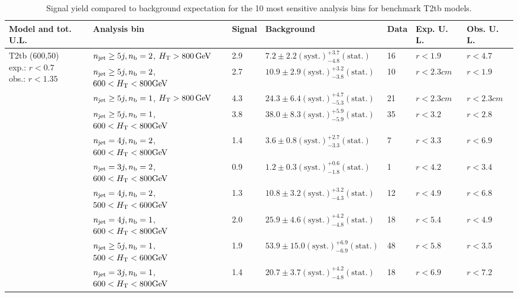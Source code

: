 \begin{table}[h!] 
  \scriptsize
  \caption{ 
Signal yield compared to background expectation for the 10 most sensitive analysis bins 
for benchmark T2tb models.
  \label{tab:sigBenchmarksYields_T2tb}}
  \centering 
  \begin{tabular}{ lllllll } 
    \hline 
    \hline 
    Model and tot. U.L. & Analysis bin & Signal & Background & Data & Exp. U. L. & Obs. U. L. \\ \hline
\multirow{10}{*}{\parbox[t]{2.3cm}{T2tb (600,50)\\exp.: $r<0.7$\\obs.: $r<1.35$}}
 & $n_{\mathrm{jet}} \geq5j,n_{\text{b}} =2$, $\mbox{$H_\text{T}$} > 800 \, \mathrm{GeV}$ & 2.9 & $7.2 \pm 2.2 \mathrm{(syst.)} ^{+3.7}_{-4.8} \mathrm{(stat.)}$ & 16 & $r < 1.9$ & $r < 4.7$\\ 
 & $n_{\mathrm{jet}} \geq5j,n_{\text{b}} =2$, $600 < \mbox{$H_\text{T}$} < 800 \mathrm{GeV}$ & 2.7 & $10.9 \pm 2.9 \mathrm{(syst.)} ^{+3.2}_{-3.8} \mathrm{(stat.)}$ & 10 & $r < 2.3cm$ & $r < 1.9$\\ 
 & $n_{\mathrm{jet}} \geq5j,n_{\text{b}} =1$, $\mbox{$H_\text{T}$} > 800 \, \mathrm{GeV}$ & 4.3 & $24.3 \pm 6.4 \mathrm{(syst.)} ^{+4.7}_{-5.3} \mathrm{(stat.)}$ & 21 & $r < 2.3cm$ & $r < 2.3cm$\\ 
 & $n_{\mathrm{jet}} \geq5j,n_{\text{b}} =1$, $600 < \mbox{$H_\text{T}$} < 800 \mathrm{GeV}$ & 3.8 & $38.0 \pm 8.3 \mathrm{(syst.)} ^{+5.9}_{-5.9} \mathrm{(stat.)}$ & 35 & $r < 3.2$ & $r < 2.8$\\ 
 & $n_{\mathrm{jet}} =4j,n_{\text{b}} =2$, $600 < \mbox{$H_\text{T}$} < 800 \mathrm{GeV}$ & 1.4 & $3.6 \pm 0.8 \mathrm{(syst.)} ^{+2.7}_{-3.3} \mathrm{(stat.)}$ & 7 & $r < 3.3$ & $r < 6.9$\\ 
 & $n_{\mathrm{jet}} =3j,n_{\text{b}} =2$, $600 < \mbox{$H_\text{T}$} < 800 \mathrm{GeV}$ & 0.9 & $1.2 \pm 0.3 \mathrm{(syst.)} ^{+0.6}_{-1.8} \mathrm{(stat.)}$ & 1 & $r < 4.2$ & $r < 3.4$\\ 
 & $n_{\mathrm{jet}} =4j,n_{\text{b}} =2$, $500 < \mbox{$H_\text{T}$} < 600 \mathrm{GeV}$ & 1.3 & $10.8 \pm 3.2 \mathrm{(syst.)} ^{+3.2}_{-4.3} \mathrm{(stat.)}$ & 12 & $r < 4.9$ & $r < 6.8$\\ 
 & $n_{\mathrm{jet}} =4j,n_{\text{b}} =1$, $600 < \mbox{$H_\text{T}$} < 800 \mathrm{GeV}$ & 2.0 & $25.9 \pm 4.6 \mathrm{(syst.)} ^{+4.2}_{-4.8} \mathrm{(stat.)}$ & 18 & $r < 5.4$ & $r < 4.9$\\ 
 & $n_{\mathrm{jet}} \geq5j,n_{\text{b}} =1$, $500 < \mbox{$H_\text{T}$} < 600 \mathrm{GeV}$ & 1.9 & $53.9 \pm 15.0 \mathrm{(syst.)} ^{+6.9}_{-6.9} \mathrm{(stat.)}$ & 48 & $r < 5.8$ & $r < 3.5$\\ 
 & $n_{\mathrm{jet}} =3j,n_{\text{b}} =1$, $600 < \mbox{$H_\text{T}$} < 800 \mathrm{GeV}$ & 1.4 & $20.7 \pm 3.7 \mathrm{(syst.)} ^{+4.2}_{-4.8} \mathrm{(stat.)}$ & 18 & $r < 6.9$ & $r < 7.2$\\ \hline

\end{tabular}
\end{table}
